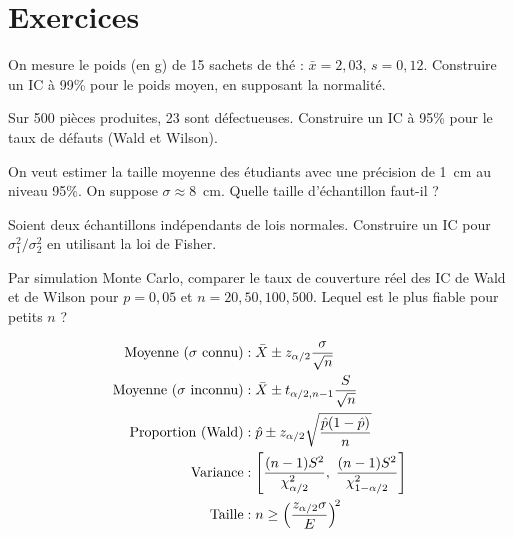 \section{Exercices}

\begin{exercice}
On mesure le poids (en g) de 15 sachets de th\'e : $\bar{x}=2{,}03$, $s=0{,}12$. Construire un IC \`a 99\% pour le poids moyen, en supposant la normalit\'e.
\end{exercice}

\begin{exercice}
Sur 500 pi\`eces produites, 23 sont d\'efectueuses. Construire un IC \`a 95\% pour le taux de d\'efauts (Wald et Wilson).
\end{exercice}

\begin{exercice}
On veut estimer la taille moyenne des \'etudiants avec une pr\'ecision de 1~cm au niveau 95\%. On suppose $\sigma\approx 8$~cm. Quelle taille d'\'echantillon faut-il ?
\end{exercice}

\begin{exercice}
Soient deux \'echantillons ind\'ependants de lois normales. Construire un IC pour $\sigma_1^2/\sigma_2^2$ en utilisant la loi de Fisher.
\end{exercice}

\begin{exercice}
Par simulation Monte Carlo, comparer le taux de couverture r\'eel des IC de Wald et de Wilson pour $p=0{,}05$ et $n=20,50,100,500$. Lequel est le plus fiable pour petits $n$ ?
\end{exercice}

\begin{formules}
\begin{align*}
\text{Moyenne ($\sigma$ connu)} &: \bar{X}\pm z_{\alpha/2}\frac{\sigma}{\sqrt{n}} \\
\text{Moyenne ($\sigma$ inconnu)} &: \bar{X}\pm t_{\alpha/2,n-1}\frac{S}{\sqrt{n}} \\
\text{Proportion (Wald)} &: \hat{p}\pm z_{\alpha/2}\sqrt{\frac{\hat{p}(1-\hat{p})}{n}} \\
\text{Variance} &: \left[\frac{(n-1)S^2}{\chi^2_{\alpha/2}},\;\frac{(n-1)S^2}{\chi^2_{1-\alpha/2}}\right] \\
\text{Taille} &: n\geq\left(\frac{z_{\alpha/2}\sigma}{E}\right)^{\!2}
\end{align*}
\end{formules}
